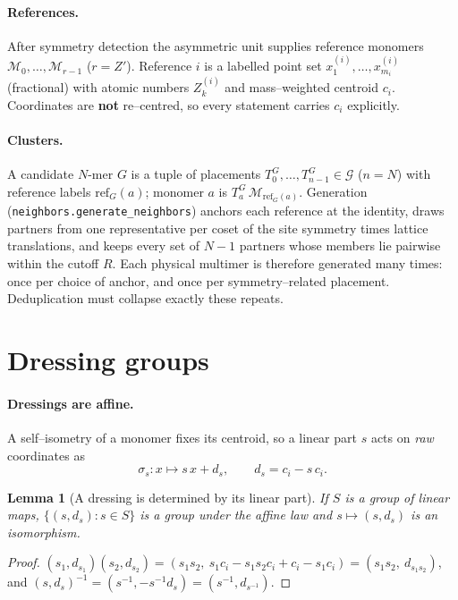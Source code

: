 \documentclass[11pt]{article}
\newtheorem{lemma}[theorem]{Lemma}
\theoremstyle{definition}
\newcommand{\Grp}{\mathcal{G}}
\newcommand{\inv}{^{-1}}
\begin{document}
\paragraph{References.}
After symmetry detection the asymmetric unit supplies reference monomers
$\mathcal{M}_0,\dots,\mathcal{M}_{r-1}$ ($r=Z'$). Reference $i$ is a labelled
point set $x^{(i)}_1,\dots,x^{(i)}_{m_i}$ (fractional) with atomic numbers
$Z^{(i)}_k$ and mass--weighted centroid $c_i$. Coordinates are \textbf{not}
re--centred, so every statement carries $c_i$ explicitly.

\paragraph{Clusters.}
A candidate $N$-mer $G$ is a tuple of placements
$T^G_0,\dots,T^G_{n-1}\in\Grp$ ($n=N$) with reference labels
$\mathrm{ref}_G(a)$; monomer $a$ is $T^G_a\,\mathcal{M}_{\mathrm{ref}_G(a)}$.
Generation (\texttt{neighbors.generate\_neighbors}) anchors each reference at the
identity, draws partners from one representative per coset of the site symmetry
times lattice translations, and keeps every set of $N-1$ partners whose members
lie pairwise within the cutoff $R$. Each physical multimer is therefore generated
many times: once per choice of anchor, and once per symmetry--related placement.
Deduplication must collapse exactly these repeats.

\section{Dressing groups}\label{sec:dress}

\paragraph{Dressings are affine.}
A self--isometry of a monomer fixes its centroid, so a linear part $s$ acts on
\emph{raw} coordinates as
\begin{equation}\label{eq:dressing}
  \sigma_s:x\mapsto s\,x+d_s,\qquad d_s=c_i-s\,c_i .
\end{equation}

\begin{lemma}[A dressing is determined by its linear part]\label{lem:dress}
If $S$ is a group of linear maps, $\{(s,d_s):s\in S\}$ is a group under the
affine law and $s\mapsto(s,d_s)$ is an isomorphism.
\end{lemma}

\begin{proof}
$(s_1,d_{s_1})(s_2,d_{s_2})=(s_1s_2,\ s_1c_i-s_1s_2c_i+c_i-s_1c_i)=(s_1s_2,\ d_{s_1s_2})$,
and $(s,d_s)\inv=(s\inv,-s\inv d_s)=(s\inv,d_{s\inv})$.
\end{proof}
\end{document}
